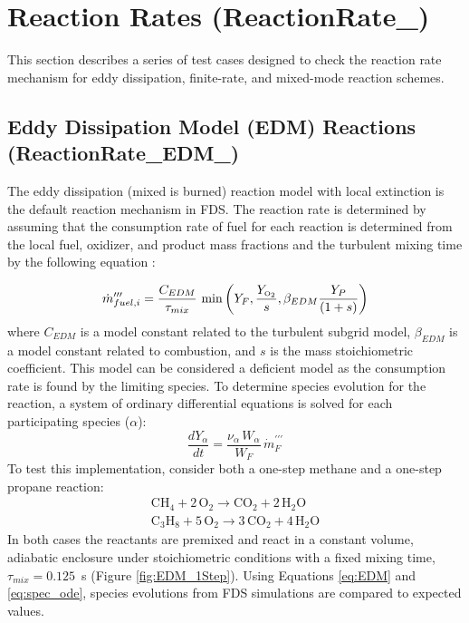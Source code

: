 \documentclass[11pt]{book}
\begin{document}
\clearpage

\section{Reaction Rates (ReactionRate\_)}

This section describes a series of test cases designed to check the reaction rate mechanism for eddy dissipation, finite-rate, and mixed-mode reaction schemes.

\subsection{Eddy Dissipation Model (EDM) Reactions (ReactionRate\_EDM\_)}

The eddy dissipation (mixed is burned) reaction model with local extinction is the default reaction mechanism in FDS. The reaction rate is determined by assuming that the consumption rate of fuel for each reaction is determined from the local fuel, oxidizer, and product mass fractions and the turbulent mixing time by the following equation \cite{Poinsot:TNC}:

\begin{equation}\label{eq:EDM}
\dot{m}^{\prime\prime\prime}_{fuel,i} = \frac{C_{EDM}}{\tau_{mix}} \, \min \left( Y_F,\frac{Y_{\tiny \hbox{O}_2}}{s},\beta_{EDM}\frac{Y_P}{(1+s)} \right)
\end{equation}
where $C_{EDM}$ is a model constant related to the turbulent subgrid model, $\beta_{EDM}$ is a model constant related to combustion, and $s$ is the mass stoichiometric coefficient. This model can be considered a deficient model as the consumption rate is found by the limiting species. To determine species evolution for the reaction, a system of ordinary differential equations is solved for each participating species ($\alpha$):
\begin{equation}\label{eq:spec_ode}
\frac{dY_{\alpha}}{dt}= \frac{\nu_{\alpha} \, W_{\alpha}}{W_F} \, \dot{m}^{\prime\prime\prime}_{F}
\end{equation}
To test this implementation, consider both a one-step methane and a one-step propane reaction:
\begin{eqnarray}\label{eq:1step_reacs}
\mathrm{CH_4 + 2\, O_2 \rightarrow  CO_2 + 2\, H_2O} \\
\mathrm{C_3H_8 + 5\, O_2 \rightarrow  3\, CO_2 + 4\, H_2O}
\end{eqnarray}
In both cases the reactants are premixed and react in a constant volume, adiabatic enclosure under stoichiometric conditions with a fixed mixing time, $\tau_{mix}=0.125$~s (Figure \ref{fig:EDM_1Step}). Using Equations \ref{eq:EDM} and \ref{eq:spec_ode}, species evolutions from FDS simulations are compared to expected values.
\end{document}
